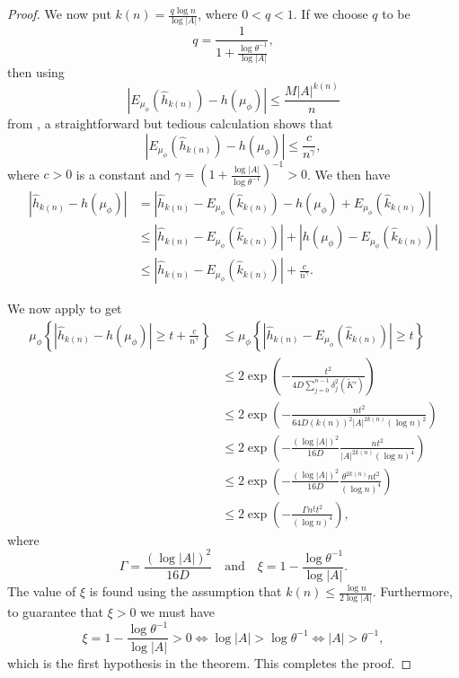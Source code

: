 \begin{theorem}
\begin{proof}
		We now put $k(n) = \frac{q\log{n}}{\log{|A|}}$, where $0 < q < 1$. If we choose $q$ to be
		\[
			q = \frac{1}{1 + \frac{\log{\theta^{-1}}}{\log{|A|}}},
		\]
		then using
		\[
			|E_{\mu_\phi}(\hat{h}_{k(n)}) - h(\mu_\phi)| \leq \frac{M|A|^{k(n)}}{n}
		\]
		from , a straightforward but tedious calculation shows that
		\begin{equation}\label{fml:cm-8}
			|E_{\mu_\phi}(\hat{h}_{k(n)}) - h(\mu_\phi)| \leq \frac{c}{n^\gamma},
		\end{equation}
		where $c > 0$ is a constant and $\gamma = \left(1 + \frac{\log{|A|}}{\log{\theta^{-1}}}\right)^{-1} > 0$. We then have
		\begin{align*}
			|\hat{h}_{k(n)} - h(\mu_\phi)| &= |\hat{h}_{k(n)} - E_{\mu_\phi}(\hat{k}_{k(n)}) - h(\mu_\phi) + E_{\mu_\phi}(\hat{k}_{k(n)})| \\
				&\leq |\hat{h}_{k(n)} - E_{\mu_\phi}(\hat{k}_{k(n)})| + |h(\mu_\phi) - E_{\mu_\phi}(\hat{k}_{k(n)})| \\
				&\leq |\hat{h}_{k(n)} - E_{\mu_\phi}(\hat{k}_{k(n)})| + \frac{c}{n^\gamma}.
		\end{align*}
		
		We now apply  to get
		\begin{align*}
			\mu_\phi\left\{\left|\hat{h}_{k(n)} - h(\mu_\phi)\right| \geq t + \frac{c}{n^\gamma}\right\} &\leq \mu_\phi\left\{\left|\hat{h}_{k(n)} - E_{\mu_\phi}(\hat{k}_{k(n)})\right| \geq t\right\} \\
				&\leq 2\exp\left(-\frac{t^2}{4D\sum_{j = 0}^{n - 1}{\delta_j^2(\tilde{K}')}}\right) \\
				&\leq 2\exp\left(-\frac{nt^2}{64D(k(n))^2|A|^{2k(n)}(\log{n})^2}\right) \\
				&\leq 2\exp\left(-\frac{(\log{|A|})^2}{16D} \frac{nt^2}{|A|^{2k(n)}(\log{n})^4}\right) \\
				&\leq 2\exp\left(-\frac{(\log{|A|})^2}{16D} \frac{\theta^{2k(n)} nt^2}{(\log{n})^4}\right) \\
				&\leq 2\exp\left(-\frac{\Gamma n^\xi t^2}{(\log{n})^4}\right),
		\end{align*}
		where
		\[
			\Gamma = \frac{(\log{|A|})^2}{16D} \quad \text{and} \quad \xi = 1 - \frac{\log{\theta^{-1}}}{\log{|A|}}.
		\]
		The value of $\xi$ is found using the assumption that $k(n) \leq \frac{\log{n}}{2\log{|A|}}$. Furthermore, to guarantee that $\xi > 0$ we must have
		\[
			\xi = 1 - \frac{\log{\theta^{-1}}}{\log{|A|}} > 0 \iff \log{|A|} > \log{\theta^{-1}} \iff |A| > \theta^{-1},
		\]
		which is the first hypothesis in the theorem. This completes the proof.
	\end{proof}
\end{theorem}


